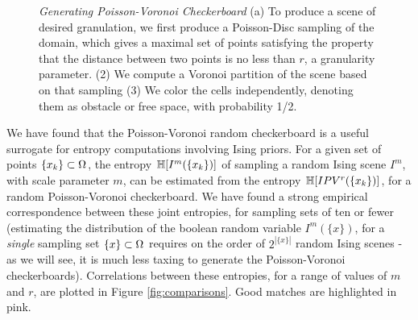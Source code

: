 \begin{figure}[ht]
\centering
{}
\quad
{}
\quad
{}
\caption{\emph{Generating Poisson-Voronoi Checkerboard} \label{fig:random coloring}
(a) To produce a scene of desired granulation, we first produce a 
Poisson-Disc sampling of the domain, which gives a maximal set of points
satisfying the property that the distance between two points is no
less than $r$, a granularity parameter. (2)  We compute a Voronoi
partition of the scene based on that sampling 
(3) We color the cells independently,
denoting them as obstacle or free space, with probability 1/2.
}
\end{figure}

We have found that the Poisson-Voronoi random checkerboard
is a useful surrogate for entropy computations 
involving Ising priors.
For a given set of points $\{x_k\}\subset\Omega$,
the entropy $\mathbb{H}[ I^m(\{x_k\})]$ 
of sampling a random Ising scene $ I^m$, with scale parameter $m$,
can be estimated from the entropy $\mathbb{H}[ IPV^r(\{x_k\})]$,
for a random Poisson-Voronoi checkerboard.
We have found a strong empirical correspondence between
these joint entropies, for sampling sets of ten or fewer
(estimating the distribution of the boolean random variable $ I^m(\{x\})$,
for a \emph{single} sampling set $\{x\}\subset\Omega$
requires on the order of $2^{|\{x\}|}$ random Ising scenes - 
as we will see, it is much less taxing to generate the Poisson-Voronoi checkerboards).
Correlations between these entropies, for a range of values of $m$
and $r$, are plotted in Figure \ref{fig:comparisons}.
Good matches are highlighted in pink.


